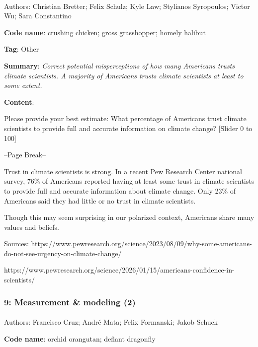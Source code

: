 \documentclass[
  letterpaper,
  DIV=11,
  numbers=noendperiod]{scrartcl}
\makeatletter
\let\oldparagraph\paragraph
\renewcommand{\paragraph}{
    \@ifstar
      \xxxParagraphStar
      \xxxParagraphNoStar
  }
\newcommand{\xxxParagraphStar}[1]{\oldparagraph*{#1}\mbox{}}
\newcommand{\xxxParagraphNoStar}[1]{\oldparagraph{#1}\mbox{}}
\makeatother
\begin{document}
\paragraph{Authors: Christian Bretter; Felix Schulz; Kyle Law; Stylianos
Syropoulos; Victor Wu; Sara
Constantino}\label{authors-christian-bretter-felix-schulz-kyle-law-stylianos-syropoulos-victor-wu-sara-constantino}

\textbf{Code name}: crushing chicken; gross grasshopper; homely halibut

\textbf{Tag}: Other

\textbf{Summary}: \emph{Correct potential misperceptions of how many
Americans trusts climate scientists. A majority of Americans trusts
climate scientists at least to some extent.}

\textbf{Content}:

Please provide your best estimate: What percentage of Americans trust
climate scientists to provide full and accurate information on climate
change? {[}Slider 0 to 100{]}

--Page Break--

Trust in climate scientists is strong. In a recent Pew Research Center
national survey, 76\% of Americans reported having at least some trust
in climate scientists to provide full and accurate information about
climate change. Only 23\% of Americans said they had little or no trust
in climate scientists.

Though this may seem surprising in our polarized context, Americans
share many values and beliefs.

Sources:
https://www.pewresearch.org/science/2023/08/09/why-some-americans-do-not-see-urgency-on-climate-change/

https://www.pewresearch.org/science/2026/01/15/americans-confidence-in-scientists/

\subsubsection{9: Measurement \& modeling
(2)}\label{measurement-modeling-2}

\paragraph{Authors: Francisco Cruz; André Mata; Felix Formanski; Jakob
Schuck}\label{authors-francisco-cruz-andruxe9-mata-felix-formanski-jakob-schuck}

\textbf{Code name}: orchid orangutan; defiant dragonfly
\end{document}
